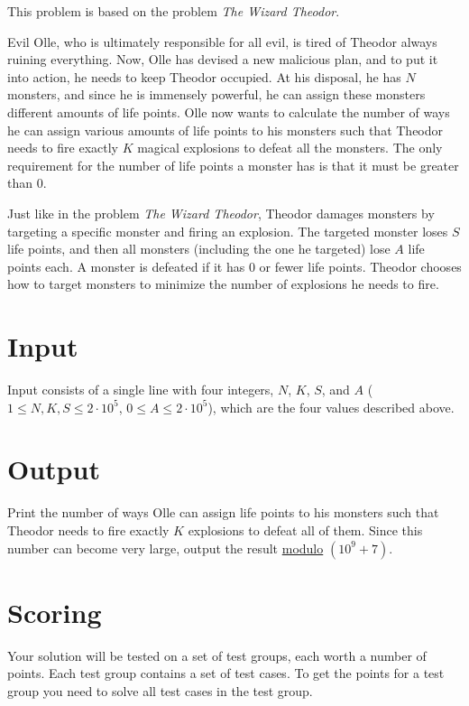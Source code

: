 
This problem is based on the problem \textit{The Wizard Theodor}.  
 
Evil Olle, who is ultimately responsible for all evil, is tired of Theodor always ruining everything.
Now, Olle has devised a new malicious plan, and to put it into action, he needs to keep Theodor occupied.
At his disposal, he has $N$ monsters, and since he is immensely powerful, he can assign these monsters
different amounts of life points. Olle now wants to calculate the number of ways he can assign various
amounts of life points to his monsters such that Theodor needs to fire exactly $K$ magical explosions
to defeat all the monsters. The only requirement for the number of life points a monster has is that
it must be greater than $0$.  
 
Just like in the problem \textit{The Wizard Theodor}, Theodor damages monsters by targeting a specific
monster and firing an explosion. The targeted monster loses $S$ life points, and then all monsters
(including the one he targeted) lose $A$ life points each. A monster is defeated if it has $0$ or fewer
life points. Theodor chooses how to target monsters to minimize the number of explosions he needs to fire.

\section*{Input}
Input consists of a single line with four integers, $N$, $K$, $S$, and $A$ ($1 \leq N, K, S \leq 2 \cdot 10^5$, $0 \leq A \leq 2 \cdot 10^5$),
which are the four values described above.

\section*{Output}
Print the number of ways Olle can assign life points to his monsters such that Theodor needs to fire exactly $K$ explosions
to defeat all of them. Since this number can become very large, output the result \href{https://en.wikipedia.org/wiki/Modulo}{modulo} $(10^9+7)$.

\section*{Scoring}
Your solution will be tested on a set of test groups, each worth a number of points. Each test group contains
a set of test cases. To get the points for a test group you need to solve all test cases in the test group.

